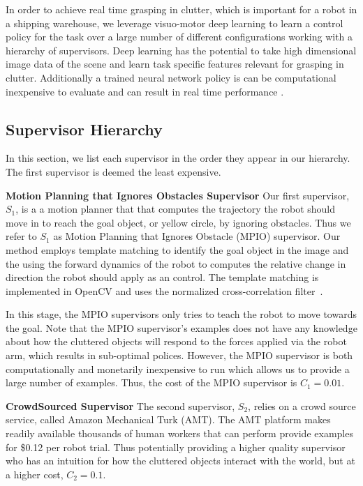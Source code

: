 \documentclass[10pt, conference]{ieeeconf}      %
\begin{document}
In order to achieve real time grasping in clutter, which is important for a robot in a shipping warehouse, we leverage  visuo-motor deep learning to learn a control policy for the task over a large number of different configurations working with a hierarchy of supervisors. Deep learning has the potential to take high dimensional image data of the scene and learn task specific features relevant for grasping in clutter. Additionally a trained neural network policy is can be computational inexpensive to evaluate and can result in real time performance \cite{levine2015end}.

\subsection{Supervisor Hierarchy}\label{sec:hier}
In this section, we list each supervisor in the order they appear in our hierarchy. The first supervisor is deemed the least expensive. 

\noindent \textbf{Motion Planning that Ignores Obstacles Supervisor} Our first supervisor, $S_1$, is a a motion planner that that computes the trajectory the robot should move in to reach the goal object, or yellow circle, by ignoring obstacles.  Thus we refer to $S_1$ as Motion Planning that Ignores Obstacle (MPIO) supervisor. Our method employs template matching to identify the goal object in the image and the using the forward dynamics of the robot to computes the relative change in direction the robot should apply as an control. The template matching is implemented in OpenCV and uses the normalized cross-correlation filter~\cite{opencv_library}.

In this stage, the MPIO supervisors only tries to teach the robot to move towards the goal. Note that the MPIO supervisor's examples does not have any knowledge about how the cluttered objects will respond to the forces applied via the robot arm, which results in sub-optimal polices. However, the MPIO supervisor is both computationally and monetarily inexpensive to run which allows us to provide a large number of examples. Thus, the cost of the MPIO supervisor is $C_1 = 0.01$. 


\noindent \textbf{CrowdSourced Supervisor} The second supervisor, $S_2$, relies on a crowd source service, called Amazon Mechanical Turk (AMT). The AMT platform makes readily available thousands of human workers that can perform  provide examples for  \$0.12 per robot trial. Thus potentially providing a higher quality supervisor who has an intuition for how the cluttered objects interact with the world, but at a  higher cost, $C_2 = 0.1$.
\end{document}
